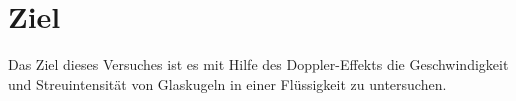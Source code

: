 \section{Ziel}
\label{sec:Ziel}
Das Ziel dieses Versuches ist es mit Hilfe des Doppler-Effekts die Geschwindigkeit und Streuintensität von Glaskugeln in einer Flüssigkeit zu untersuchen.